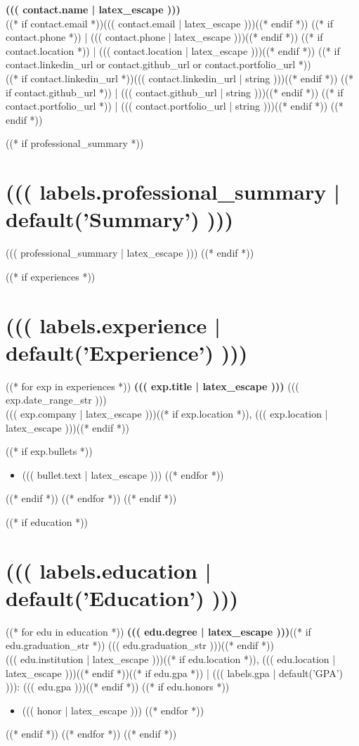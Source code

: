 \documentclass[11pt,letterpaper]{article}
\begin{document}
\begin{center}
    {\Large\bfseries ((( contact.name | latex_escape )))}\\[4pt]
    ((* if contact.email *))((( contact.email | latex_escape )))((* endif *))%
    ((* if contact.phone *)) | ((( contact.phone | latex_escape )))((* endif *))%
    ((* if contact.location *)) | ((( contact.location | latex_escape )))((* endif *))
    ((* if contact.linkedin_url or contact.github_url or contact.portfolio_url *))
    \\
    ((* if contact.linkedin_url *))((( contact.linkedin_url | string )))((* endif *))%
    ((* if contact.github_url *)) | ((( contact.github_url | string )))((* endif *))%
    ((* if contact.portfolio_url *)) | ((( contact.portfolio_url | string )))((* endif *))
    ((* endif *))
\end{center}

((* if professional_summary *))
\section{((( labels.professional_summary | default('Summary') )))}
((( professional_summary | latex_escape )))
((* endif *))

((* if experiences *))
\section{((( labels.experience | default('Experience') )))}

((* for exp in experiences *))
\noindent\textbf{((( exp.title | latex_escape )))} \hfill ((( exp.date_range_str )))\\
((( exp.company | latex_escape )))((* if exp.location *)), ((( exp.location | latex_escape )))((* endif *))

((* if exp.bullets *))
\begin{itemize}
((* for bullet in exp.bullets *))
    \item ((( bullet.text | latex_escape )))
((* endfor *))
\end{itemize}
((* endif *))
((* endfor *))
((* endif *))

((* if education *))
\section{((( labels.education | default('Education') )))}

((* for edu in education *))
\noindent\textbf{((( edu.degree | latex_escape )))}((* if edu.graduation_str *)) \hfill ((( edu.graduation_str )))((* endif *))\\
((( edu.institution | latex_escape )))((* if edu.location *)), ((( edu.location | latex_escape )))((* endif *))((* if edu.gpa *)) | ((( labels.gpa | default('GPA') ))): ((( edu.gpa )))((* endif *))
((* if edu.honors *))
\begin{itemize}
((* for honor in edu.honors *))
    \item ((( honor | latex_escape )))
((* endfor *))
\end{itemize}
((* endif *))
((* endfor *))
((* endif *))
\end{document}
